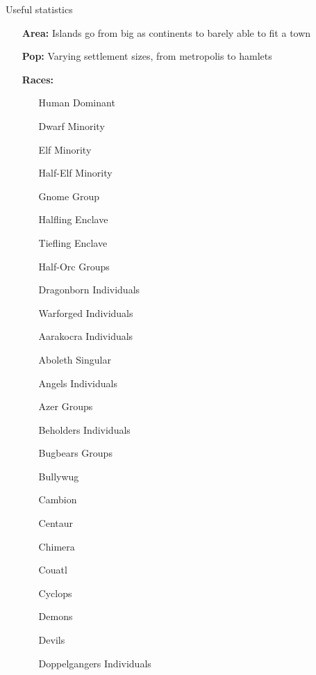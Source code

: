 \begin{monsterbox}{Useful statistics}
    \begin{itemize}[leftmargin=1.2cm, labelsep=0.2cm]
        \item[\textbf{Area:}] Islands go from big as continents to barely able to fit a town
        \item[\textbf{Pop:}] Varying settlement sizes, from metropolis to hamlets
        \item[\textbf{Races:}] \hspace*{\fill}
              \begin{itemize}[leftmargin=1.0cm, labelsep=0.2cm]
                  \item[Human] Dominant
                  \item[Dwarf] Minority
                  \item[Elf] Minority
                  \item[Half-Elf] Minority
                  \item[Gnome] Group
                  \item[Halfling] Enclave
                  \item[Tiefling] Enclave
                  \item[Half-Orc] Groups
                  \item[Dragonborn] Individuals
                  \item[Warforged] Individuals
                  \item[Aarakocra] Individuals
                  \item[Aboleth] Singular
                  \item[Angels] Individuals
                  \item[Azer] Groups
                  \item[Beholders] Individuals
                  \item[Bugbears] Groups
                  \item[Bullywug]
                  \item[Cambion]
                  \item[Centaur]
                  \item[Chimera]
                  \item[Couatl]
                  \item[Cyclops]
                  \item[Demons]
                  \item[Devils]
                  \item[Doppelgangers] Individuals
                  \item[]       
              \end{itemize}
    \end{itemize}
\end{monsterbox}


